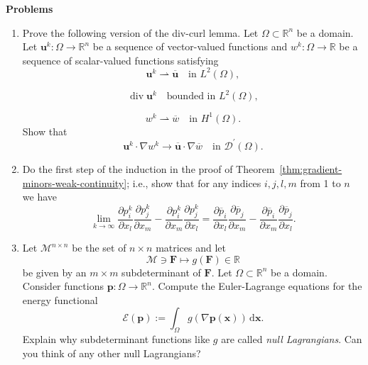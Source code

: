 \textbf{Problems}

\begin{enumerate}[label=\thesection.\arabic*.,ref=\thesection.\arabic*,start=9,series=book-problems]

\item\label{ex:div-curl-scalar-gradient-version} Prove the following version of the div-curl lemma. Let $\Omega\subset\mathbb{R}^n$ be a domain. Let $\bm{u}^k:\Omega\to\mathbb{R}^n$ be a sequence of vector-valued functions and $w^k:\Omega\to\mathbb{R}$ be a sequence of scalar-valued functions satisfying
\begin{equation}\label{eq:div-curl-exercise-vector-weak-ltwo-limit}
\bm{u}^k\rightharpoonup\overline{\bm{u}}\quad\text{in }L^2(\Omega),
\end{equation}

\begin{equation}\label{eq:div-curl-exercise-divergence-ltwo-bound}
\operatorname{div}\bm{u}^k\quad\text{bounded in }L^2(\Omega),
\end{equation}

\begin{equation}\label{eq:div-curl-exercise-scalar-weak-hone-limit}
w^k\rightharpoonup\overline w\quad\text{in }H^1(\Omega).
\end{equation}
Show that
\begin{equation}\label{eq:div-curl-exercise-gradient-product-distributional-limit}
\bm{u}^k\cdot\nabla w^k\to\overline{\bm{u}}\cdot\nabla\overline w\quad\text{in }\mathcal{D}^{\prime}(\Omega).
\end{equation}


\item\label{ex:gradient-minors-induction-first-step} Do the first step of the induction in the proof of Theorem~\ref{thm:gradient-minors-weak-continuity}; i.e., show that for any indices $i,j,l,m$ from 1 to $n$ we have\[\lim_{k\to\infty}\dfrac{\partial p_i^k}{\partial x_l}\dfrac{\partial p_j^k}{\partial x_m}-\dfrac{\partial p_i^k}{\partial x_m}\dfrac{\partial p_j^k}{\partial x_l}=\dfrac{\partial\overline p_i}{\partial x_l}\dfrac{\partial\overline p_j}{\partial x_m}-\dfrac{\partial\overline p_i}{\partial x_m}\dfrac{\partial\overline p_j}{\partial x_l}.\]

\item\label{ex:subdeterminants-null-lagrangians} Let $\mathcal{M}^{n\times n}$ be the set of $n\times n$ matrices and let\[\mathcal{M}\ni\bm{F}\mapsto g(\bm{F})\in\mathbb{R}\]be given by an $m\times m$ subdeterminant of $\bm{F}$. Let $\Omega\subset\mathbb{R}^n$ be a domain. Consider functions $\bm{p}:\Omega\to\mathbb{R}^n$. Compute the Euler-Lagrange equations for the energy functional
\begin{equation}\label{eq:subdeterminant-null-lagrangian-energy}
\mathcal{E}(\bm{p}):=\int_\Omega g(\nabla\bm{p}(\bm{x}))\,\mathrm{d}\bm{x}.
\end{equation}
Explain why subdeterminant functions like $g$ are called \emph{null Lagrangians}. Can you think of any other null Lagrangians?


\end{enumerate}
